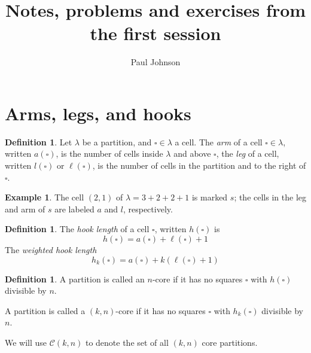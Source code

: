 \documentclass{article}
\title{Notes, problems and exercises from the first session}
\author{Paul Johnson}
\newcommand{\CC}{\mathcal{C}}
\theoremstyle{definition}
\newtheorem{example}[dummy]{Example}
\newtheorem{definition}[dummy]{Definition}
\begin{document}
\maketitle



\section{Arms, legs, and hooks}
\begin{definition}

Let $\lambda$ be a partition, and $\square\in\lambda$ a cell.  The \emph{arm} of a cell $\square\in\lambda$, written $a(\square)$, is the number of cells inside $\lambda$ and above $\square$, the \emph{leg} of a cell, written $l(\square)$ or $\ell(\square)$, is the number of cells in the partition and to the right of $\square$.

\end{definition}

\begin{example}
The cell $(2,1)$ of $\lambda=3+2+2+1$ is marked $s$; the cells in the
leg and arm of $s$ are labeled $a$ and $l$, respectively.
\begin{center}
\end{center}
\end{example}


\begin{definition}
The \emph{hook length} of a cell $\square$, written $h(\square)$ is
$$h(\square)=a(\square)+\ell(\square)+1$$
The \emph{weighted hook length} 
$$h_k(\square)=a(\square)+k(\ell(\square)+1)$$
\end{definition}

\begin{definition}
A partition is called an $n$-core if it has no squares $\square$ with $h(\square)$ divisible by $n$.

A partition is called a $(k,n)$-core if it has no squares $\square$ with $h_k(\square)$ divisible by $n$.

We will use $\CC(k,n)$ to denote the set of all $(k,n)$ core partitions.
\end{definition}
\end{document}
